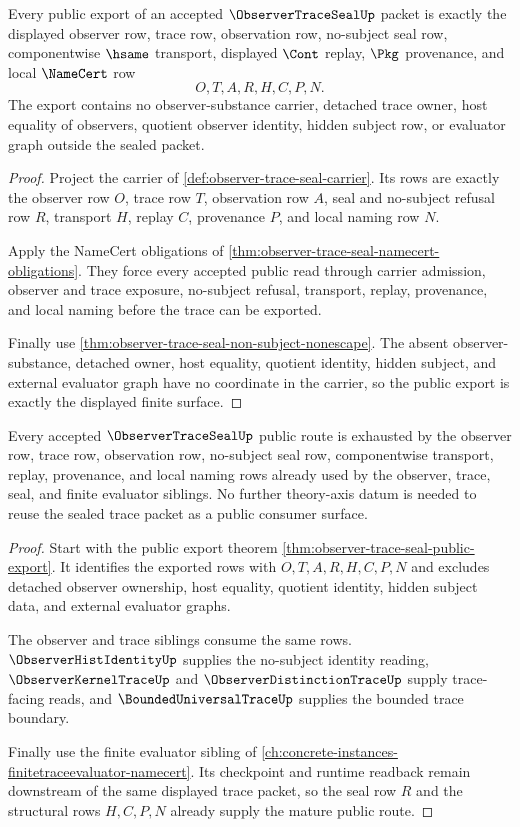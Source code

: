 \begin{theorem}
\label{thm:observer-trace-seal-public-export}
Every public export of an accepted $\ObserverTraceSealUp$ packet is exactly the displayed observer row, trace row, observation row, no-subject seal row, componentwise $\hsame$ transport, displayed $\Cont$ replay, $\Pkg$ provenance, and local $\NameCert$ row
$$
O,T,A,R,H,C,P,N .
$$
The export contains no observer-substance carrier, detached trace owner, host equality of observers, quotient observer identity, hidden subject row, or evaluator graph outside the sealed packet.
\end{theorem}
\begin{proof}
Project the carrier of \autoref{def:observer-trace-seal-carrier}. Its rows are exactly the observer row $O$, trace row $T$, observation row $A$, seal and no-subject refusal row $R$, transport $H$, replay $C$, provenance $P$, and local naming row $N$.

Apply the NameCert obligations of \autoref{thm:observer-trace-seal-namecert-obligations}. They force every accepted public read through carrier admission, observer and trace exposure, no-subject refusal, transport, replay, provenance, and local naming before the trace can be exported.

Finally use \autoref{thm:observer-trace-seal-non-subject-nonescape}. The absent observer-substance, detached owner, host equality, quotient identity, hidden subject, and external evaluator graph have no coordinate in the carrier, so the public export is exactly the displayed finite surface.
\end{proof}

\begin{theorem}
\label{thm:observer-trace-seal-mature-route}
Every accepted $\ObserverTraceSealUp$ public route is exhausted by the observer row, trace row, observation row, no-subject seal row, componentwise transport, replay, provenance, and local naming rows already used by the observer, trace, seal, and finite evaluator siblings. No further theory-axis datum is needed to reuse the sealed trace packet as a public consumer surface.
\end{theorem}
\begin{proof}
Start with the public export theorem \autoref{thm:observer-trace-seal-public-export}. It identifies the exported rows with $O,T,A,R,H,C,P,N$ and excludes detached observer ownership, host equality, quotient identity, hidden subject data, and external evaluator graphs.

The observer and trace siblings consume the same rows. $\ObserverHistIdentityUp$ supplies the no-subject identity reading, $\ObserverKernelTraceUp$ and $\ObserverDistinctionTraceUp$ supply trace-facing reads, and $\BoundedUniversalTraceUp$ supplies the bounded trace boundary.

Finally use the finite evaluator sibling of \autoref{ch:concrete-instances-finitetraceevaluator-namecert}. Its checkpoint and runtime readback remain downstream of the same displayed trace packet, so the seal row $R$ and the structural rows $H,C,P,N$ already supply the mature public route.
\end{proof}

